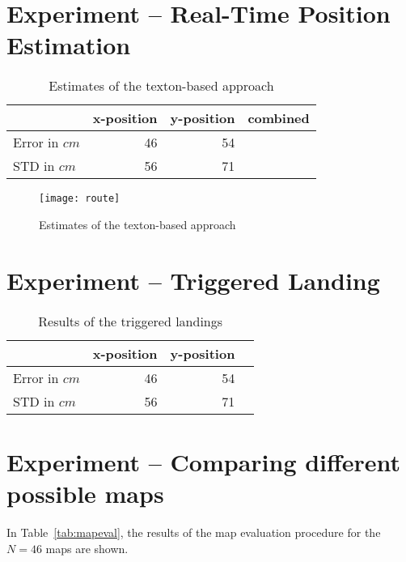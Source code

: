 \section{Experiment -- Real-Time Position Estimation}
\label{sec:experiment-real-time}

\begin{table}[H]
  \centering
  \begin{tabular}{lrrr}
    \toprule
    & x-position & y-position & combined\\
    \midrule
    Error in $cm$ & 46 & 54\\
    STD in $cm$ & 56 & 71\\
    \bottomrule
  \end{tabular}
  \caption[Estimates of the texton-based approach]{Estimates of the texton-based approach}
  \label{tab:targetlanding}
\end{table}
\begin{figure}
\texttt{[image: route]}
  \caption[Estimates of the texton-based approach]{Estimates of the texton-based approach}
  \label{fig:route}
\end{figure}

\section{Experiment -- Triggered Landing}
\label{sec:landing}

\begin{table}[H]
  \centering
  \begin{tabular}{lrrr}
    \toprule
    & x-position & y-position\\
    \midrule
    Error in $cm$ & 46 & 54\\
    STD in $cm$ & 56 & 71\\
    \bottomrule
  \end{tabular}
  \caption[Triggered landings]{Results of the triggered landings}
  \label{tab:targetlanding}

\end{table}

\section{Experiment -- Comparing different possible maps}
\label{sec:experiment-maps}

In Table~\ref{tab:mapeval}, the results of the map evaluation
procedure for the $N = 46$ maps are shown.

